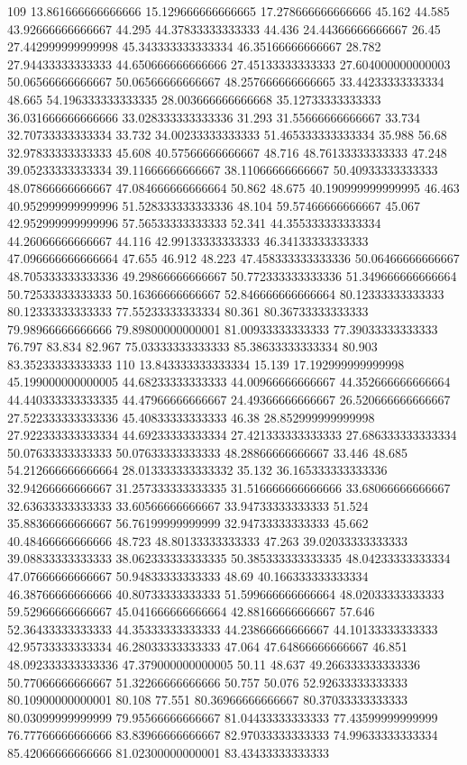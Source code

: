 109 13.861666666666666 15.129666666666665 17.278666666666666 45.162 44.585 43.92666666666667 44.295 44.37833333333333 44.436 24.44366666666667 26.45 27.442999999999998 45.343333333333334 46.35166666666667 28.782 27.94433333333333 44.650666666666666 27.45133333333333 27.604000000000003 50.06566666666667 50.06566666666667 48.257666666666665 33.44233333333334 48.665 54.196333333333335 28.003666666666668 35.12733333333333 36.031666666666666 33.028333333333336 31.293 31.55666666666667 33.734 32.70733333333334 33.732 34.00233333333333 51.465333333333334 35.988 56.68 32.97833333333333 45.608 40.57566666666667 48.716 48.76133333333333 47.248 39.05233333333334 39.11666666666667 38.11066666666667 50.40933333333333 48.07866666666667 47.084666666666664 50.862 48.675 40.190999999999995 46.463 40.952999999999996 51.528333333333336 48.104 59.57466666666667 45.067 42.952999999999996 57.56533333333333 52.341 44.355333333333334 44.26066666666667 44.116 42.99133333333333 46.34133333333333 47.096666666666664 47.655 46.912 48.223 47.458333333333336 50.06466666666667 48.705333333333336 49.29866666666667 50.772333333333336 51.349666666666664 50.72533333333333 50.16366666666667 52.846666666666664 80.12333333333333 80.12333333333333 77.55233333333334 80.361 80.36733333333333 79.98966666666666 79.89800000000001 81.00933333333333 77.39033333333333 76.797 83.834 82.967 75.03333333333333 85.38633333333334 80.903 83.35233333333333
110 13.843333333333334 15.139 17.192999999999998 45.199000000000005 44.68233333333333 44.00966666666667 44.352666666666664 44.440333333333335 44.47966666666667 24.49366666666667 26.520666666666667 27.522333333333336 45.40833333333333 46.38 28.852999999999998 27.922333333333334 44.69233333333334 27.421333333333333 27.686333333333334 50.07633333333333 50.07633333333333 48.28866666666667 33.446 48.685 54.212666666666664 28.013333333333332 35.132 36.165333333333336 32.94266666666667 31.257333333333335 31.516666666666666 33.68066666666667 32.63633333333333 33.60566666666667 33.94733333333333 51.524 35.88366666666667 56.76199999999999 32.94733333333333 45.662 40.48466666666666 48.723 48.80133333333333 47.263 39.02033333333333 39.08833333333333 38.062333333333335 50.385333333333335 48.04233333333334 47.07666666666667 50.94833333333333 48.69 40.166333333333334 46.38766666666666 40.80733333333333 51.599666666666664 48.02033333333333 59.52966666666667 45.041666666666664 42.88166666666667 57.646 52.36433333333333 44.35333333333333 44.23866666666667 44.10133333333333 42.95733333333334 46.28033333333333 47.064 47.64866666666667 46.851 48.092333333333336 47.379000000000005 50.11 48.637 49.266333333333336 50.77066666666667 51.32266666666666 50.757 50.076 52.92633333333333 80.10900000000001 80.108 77.551 80.36966666666667 80.37033333333333 80.03099999999999 79.95566666666667 81.04433333333333 77.43599999999999 76.77766666666666 83.83966666666667 82.97033333333333 74.99633333333334 85.42066666666666 81.02300000000001 83.43433333333333
